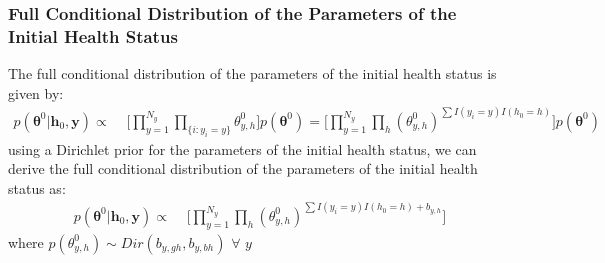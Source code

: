 \documentclass{article}
\begin{document}
\subsubsection{Full Conditional Distribution of the Parameters of the Initial Health Status}
The full conditional distribution of the parameters of the initial health status is given by:
\begin{align*}
    p(\bm{\theta}^0|\bm{h}_0,\bm{y})\propto\,\,& \Big[\prod_{y=1}^{N_y}\prod_{\lbrace i: y_i=y \rbrace} \theta^0_{y,h}\Big] p(\bm{\theta}^0)=\Big[\prod_{y=1}^{N_y}\prod_{h}(\theta^0_{y,h})^{\sum I(y_i=y)I(h_0=h)}\Big] p(\bm{\theta}^0)
\end{align*}
using a Dirichlet prior for the parameters of the initial health status, we can derive the full conditional distribution of the parameters of the initial health status as:
\begin{align*}
    p(\bm{\theta}^0|\bm{h}_0,\bm{y})\propto\,\,& \Big[\prod_{y=1}^{N_y}\prod_{h}(\theta^0_{y,h})^{\sum I(y_i=y)I(h_0=h)+b_{y,h}}\Big]
\end{align*}
where $p(\theta^0_{y,h})\sim Dir(b_{y,gh},b_{y,bh}) \,\,\forall\,\, y$
\end{document}
